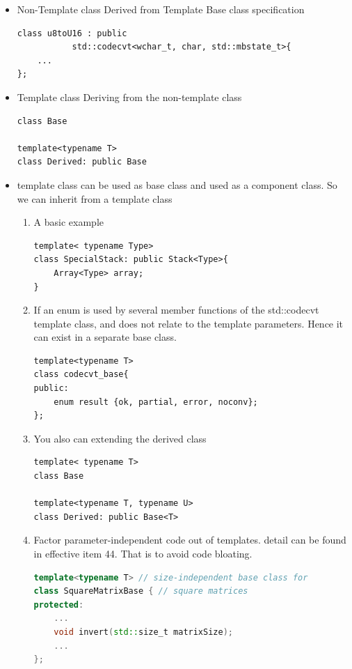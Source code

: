 \documentclass[a4paper,11pt,twoside]{book}
\begin{document}
\begin{itemize}
	
	\item Non-Template class Derived from Template Base class specification

\begin{lstlisting}[numbers=none]
class u8toU16 : public 
           std::codecvt<wchar_t, char, std::mbstate_t>{
	...
};
\end{lstlisting}

	\item Template class Deriving from the non-template class
\begin{lstlisting}[numbers=none]
class Base
	
template<typename T>
class Derived: public Base
\end{lstlisting}	
	
	\item template class can be used as base class and used as a component class. So we can inherit from a template class
\begin{enumerate}
	\item A basic example
\begin{lstlisting}[numbers=none]
template< typename Type>
class SpecialStack: public Stack<Type>{
	Array<Type> array;
}
\end{lstlisting}	
	
	\item If an enum is used by several member functions of the std::codecvt template class, and does not relate to the template parameters. Hence it can exist in a separate base class.
	
\begin{lstlisting}[numbers=none]
template<typename T>
class codecvt_base{
public:
	enum result {ok, partial, error, noconv};
};
\end{lstlisting}
	
	\item You also can extending the derived class
\begin{lstlisting}[numbers=none]
template< typename T>
class Base
	
template<typename T, typename U>
class Derived: public Base<T>
\end{lstlisting}
	
	
	\item Factor parameter-independent code out of templates. detail can be found in effective item 44. That is to avoid code bloating.
\begin{lstlisting}[frame=single, language=c++]
template<typename T> // size-independent base class for
class SquareMatrixBase { // square matrices
protected:
	...
	void invert(std::size_t matrixSize); 
	...
};
	

\end{lstlisting}
\end{enumerate}
\end{itemize}
\end{document}
